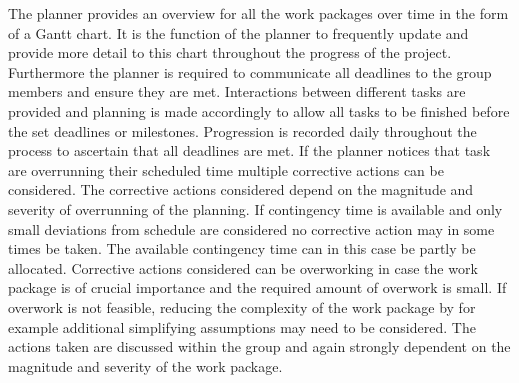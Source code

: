 The planner provides an overview for all the work packages over time in the form of a Gantt chart. It is the function of the planner to frequently update and provide more detail to this chart throughout the progress of the project. Furthermore the planner is required to communicate all deadlines to the group members and ensure they are met. Interactions between different tasks are provided and planning is made accordingly to allow all tasks to be finished before the set deadlines or milestones. Progression is recorded daily throughout the process to ascertain that all deadlines are met. If the planner notices that task are overrunning their scheduled time multiple corrective actions can be considered. The corrective actions considered depend on the magnitude and severity of overrunning of the planning. If contingency time is available and only small deviations from schedule are considered no corrective action may in some times be taken. The available contingency time can in this case be partly be allocated. Corrective actions considered can be overworking in case the work package is of crucial importance and the required amount of overwork is small. If overwork is not feasible, reducing the complexity of the work package by for example additional simplifying assumptions may need to be considered. The actions taken are discussed within the group and again strongly dependent on the magnitude and severity of the work package.



